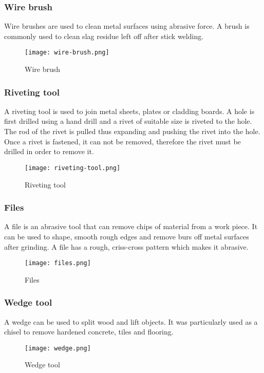 \documentclass[a4paper,12pt]{article}
\begin{document}
				\newpage
				\subsubsection*{Wire brush}
					Wire brushes are used to clean metal surfaces using abrasive force.
					A brush is commonly used to clean slag residue left off after stick welding.			
						\begin{figure}[H]
							\centering		
							\texttt{[image: wire-brush.png]}
							\caption{Wire brush}
							\label{fig:wire-brush}
						\end{figure}
						
				\subsubsection*{Riveting tool}
					A riveting tool is used to join metal sheets, plates or cladding boards.
					A hole is first drilled using a hand drill and a rivet of suitable size is riveted to the hole.
					The rod of the rivet is pulled thus expanding and pushing the rivet into the hole.
					Once a rivet is fastened, it can not be removed, therefore the rivet must be drilled in order to remove it.    
						\begin{figure}[H]
							\centering				
							\texttt{[image: riveting-tool.png]}
							\caption{Riveting tool}
							\label{fig:riveting-tool}
						\end{figure}
						
				\subsubsection*{Files}
					A file is an abrasive tool that can remove chips of material from a work piece.
					It can be used to shape, smooth rough edges and remove burs off metal surfaces after grinding.
					A file has a rough, criss-cross pattern which makes it abrasive.
						\begin{figure}[H]
							\centering				
							\texttt{[image: files.png]}
							\caption{Files}
							\label{fig:files}
						\end{figure}
						
				\subsubsection*{Wedge tool}
				 	A wedge can be used to split wood and lift objects.
				 	It was particularly used as a chisel to remove hardened concrete, tiles and flooring.
						\begin{figure}[H]
							\centering				
							\texttt{[image: wedge.png]}
							\caption{Wedge tool}
							\label{fig:wedge}
						\end{figure}
				\newpage		
\end{document}
